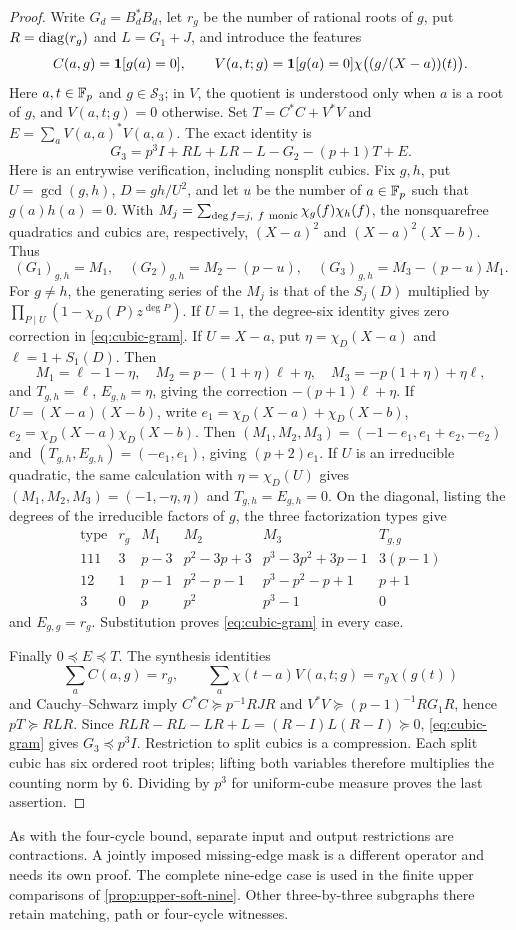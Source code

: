 \begin{proof}
Write $G_d=B_d^*B_d$, let $r_g$ be the number of rational roots of
$g$, put $R=\operatorname{diag}(r_g)$ and $L=G_1+J$, and introduce the features
\[
 C(a,g)=\mathbf 1[g(a)=0],\qquad
 V(a,t;g)=\mathbf 1[g(a)=0]\chi\bigl((g/(X-a))(t)\bigr).
\]
Here $a,t\in\mathbb F_p$ and $g\in\mathcal S_3$; in $V$, the quotient is
understood only when $a$ is a root of $g$, and $V(a,t;g)=0$ otherwise.
Set $T=C^*C+V^*V$ and $E=\sum_aV(a,a)^*V(a,a)$.
The exact identity is
\begin{equation}\label{eq:cubic-gram}
 G_3=p^3I+RL+LR-L-G_2-(p+1)T+E.
\end{equation}
Here is an entrywise verification, including nonsplit cubics.
Fix $g,h$, put $U=\gcd(g,h)$, $D=gh/U^2$, and let $u$ be the number of
$a\in\mathbb F_p$ such that $g(a)h(a)=0$. With
$M_j=\sum_{\deg f=j,\ f\ {\rm monic}}\chi_g(f)\chi_h(f)$, the
nonsquarefree quadratics and cubics are, respectively,
$(X-a)^2$ and $(X-a)^2(X-b)$. Thus
\[
 (G_1)_{g,h}=M_1,\quad (G_2)_{g,h}=M_2-(p-u),\quad
 (G_3)_{g,h}=M_3-(p-u)M_1.
\]
For $g\ne h$, the generating series of the $M_j$ is that of the
$S_j(D)$ multiplied by $\prod_{P\mid U}(1-\chi_D(P)z^{\deg P})$.
If $U=1$, the degree-six identity gives zero correction in
\eqref{eq:cubic-gram}. If $U=X-a$, put
$\eta=\chi_D(X-a)$ and $\ell=1+S_1(D)$. Then
\[
 M_1=\ell-1-\eta,\quad M_2=p-(1+\eta)\ell+\eta,\quad
 M_3=-p(1+\eta)+\eta\ell,
\]
and $T_{g,h}=\ell$, $E_{g,h}=\eta$, giving the correction
$-(p+1)\ell+\eta$.
If $U=(X-a)(X-b)$, write
$e_1=\chi_D(X-a)+\chi_D(X-b)$,
$e_2=\chi_D(X-a)\chi_D(X-b)$. Then
$(M_1,M_2,M_3)=(-1-e_1,e_1+e_2,-e_2)$ and
$(T_{g,h},E_{g,h})=(-e_1,e_1)$, giving $(p+2)e_1$.
If $U$ is an irreducible quadratic, the same calculation with
$\eta=\chi_D(U)$ gives $(M_1,M_2,M_3)=(-1,-\eta,\eta)$ and
$T_{g,h}=E_{g,h}=0$.
On the diagonal, listing the degrees of the irreducible factors
of $g$, the three factorization types give
\[
\begin{array}{c|c|c|c|c|c}
 \text{type}&r_g&M_1&M_2&M_3&T_{g,g}\\ \hline
 111&3&p-3&p^2-3p+3&p^3-3p^2+3p-1&3(p-1)\\
 12&1&p-1&p^2-p-1&p^3-p^2-p+1&p+1\\
 3&0&p&p^2&p^3-1&0
\end{array}
\]
and $E_{g,g}=r_g$. Substitution proves \eqref{eq:cubic-gram}
in every case.

Finally $0\preceq E\preceq T$. The synthesis identities
\[
 \sum_a C(a,g)=r_g,\qquad
 \sum_a\chi(t-a)V(a,t;g)=r_g\chi(g(t))
\]
and Cauchy--Schwarz imply
$C^*C\succeq p^{-1}RJR$ and
$V^*V\succeq(p-1)^{-1}RG_1R$, hence $pT\succeq RLR$.
Since
$RLR-RL-LR+L=(R-I)L(R-I)\succeq0$,
\eqref{eq:cubic-gram} gives $G_3\preceq p^3I$.
Restriction to split cubics is a compression. Each split cubic has
six ordered root triples; lifting both variables therefore multiplies
the counting norm by $6$. Dividing by $p^3$ for uniform-cube measure
proves the last assertion.
\end{proof}

As with the four-cycle bound, separate input and output restrictions
are contractions. A jointly imposed missing-edge mask is a different
operator and needs its own proof. The complete nine-edge case is used
in the finite upper comparisons of \cref{prop:upper-soft-nine}.
Other three-by-three subgraphs there retain matching, path or
four-cycle witnesses.
